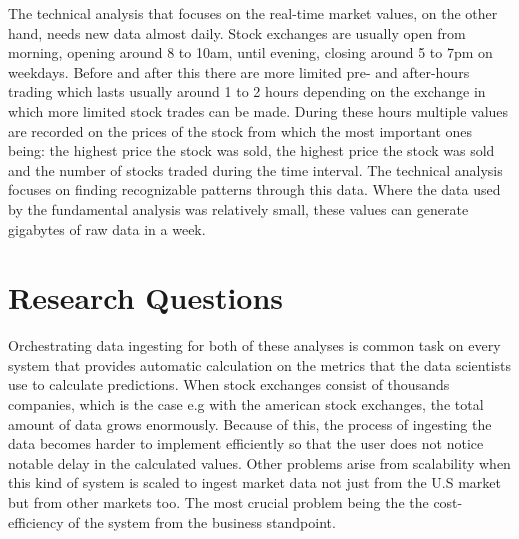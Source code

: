 \documentclass[article,11pt]{article}
\begin{document}
The technical analysis that focuses on the real-time market values, on the other hand, needs new data almost daily. Stock exchanges are usually open from morning, opening around 8 to 10am, until evening, closing around 5 to 7pm on weekdays. Before and after this there are more limited pre- and after-hours trading which lasts usually around 1 to 2 hours depending on the exchange in which more limited stock trades can be made. During these hours multiple values are recorded on the prices of the stock from which the most important ones being: the highest price the stock was sold, the highest price the stock was sold and the number of stocks traded during the time interval. The technical analysis focuses on finding recognizable patterns through this data. \cite{murphy} Where the data used by the fundamental analysis was relatively small, these values can generate gigabytes of raw data in a week.



\section{Research Questions}

Orchestrating data ingesting for both of these analyses is common task on every system that provides automatic calculation on the metrics that the data scientists use to calculate predictions. When stock exchanges consist of thousands companies, which is the case e.g with the american stock exchanges, the total amount of data grows enormously. Because of this, the process of ingesting the data becomes harder to implement efficiently so that the user does not notice notable delay in the calculated values. Other problems arise from scalability when this kind of system is scaled to ingest market data not just from the U.S market but from other markets too. The most crucial problem being the the cost-efficiency of the system from the business standpoint.
\end{document}
